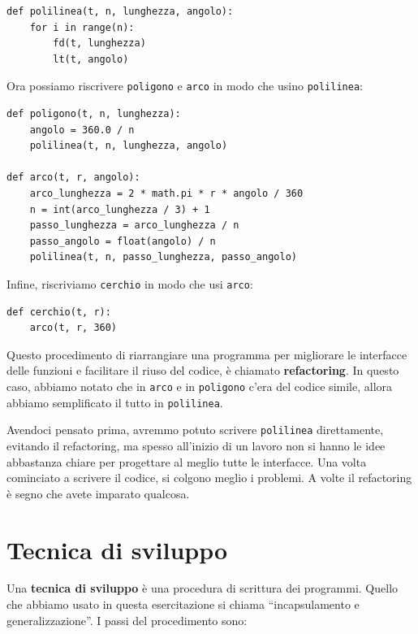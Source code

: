\documentclass[10pt]{book}
\begin{document}
\begin{verbatim}
def polilinea(t, n, lunghezza, angolo):
    for i in range(n):
        fd(t, lunghezza)
        lt(t, angolo)
\end{verbatim}
%
Ora possiamo riscrivere {\tt poligono} e {\tt arco} in modo che usino {\tt polilinea}:

\begin{verbatim}
def poligono(t, n, lunghezza):
    angolo = 360.0 / n
    polilinea(t, n, lunghezza, angolo)

def arco(t, r, angolo):
    arco_lunghezza = 2 * math.pi * r * angolo / 360
    n = int(arco_lunghezza / 3) + 1
    passo_lunghezza = arco_lunghezza / n
    passo_angolo = float(angolo) / n
    polilinea(t, n, passo_lunghezza, passo_angolo)
\end{verbatim}
%
Infine, riscriviamo {\tt cerchio} in modo che usi {\tt arco}:

\begin{verbatim}
def cerchio(t, r):
    arco(t, r, 360)
\end{verbatim}
%
Questo procedimento di riarrangiare una programma per migliorare le interfacce delle funzioni e facilitare il riuso del codice, è chiamato {\bf refactoring}.
In questo caso, abbiamo notato che in {\tt arco} e in {\tt poligono} c'era del codice simile, allora abbiamo semplificato il tutto in {\tt polilinea}.

Avendoci pensato prima, avremmo potuto scrivere {\tt polilinea} direttamente, evitando il refactoring, ma spesso all'inizio di un lavoro non si hanno le idee abbastanza chiare per progettare al meglio tutte le interfacce. Una volta cominciato a scrivere il codice, si colgono meglio i problemi. A volte il refactoring è segno che avete imparato qualcosa.


\section{Tecnica di sviluppo}

Una {\bf tecnica di sviluppo} è una procedura di scrittura dei programmi. Quello che abbiamo usato in questa esercitazione si chiama ``incapsulamento e generalizzazione''. I passi del procedimento sono:
\end{document}
